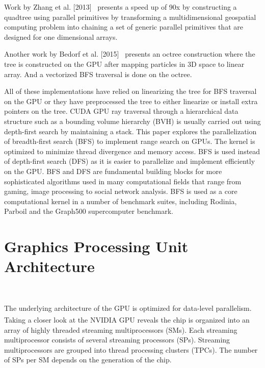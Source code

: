 Work by Zhang et al. [2013]~\cite{DBLP:journals/gis/ZhangY13} presents a speed up of 90x by constructing a quadtree using parallel primitives by transforming a multidimensional geospatial computing problem into chaining a set of generic parallel primitives that are designed for one dimensional arrays.

Another work by Bedorf et al. [2015]~\cite{Bedorf:2012:SOG:2133856.2134140} presents an octree construction where the tree is constructed on the GPU after mapping particles in 3D space to linear array. And a vectorized BFS traversal is done on the octree.

All of these implementations have relied on linearizing the tree for BFS traversal on the GPU or they have preprocessed the tree to either linearize or install extra pointers on the tree. 
CUDA GPU ray traversal through a hierarchical data structure such as a bounding volume hierarchy (BVH) is usually carried out using depth-first search by maintaining a stack.
This paper explores the parallelization of breadth-first search (BFS) to implement range search on GPUs. The kernel is optimized to minimize thread divergence and memory access. BFS is used instead of depth-first search (DFS) as it is easier to parallelize and implement efficiently on the GPU. BFS and DFS are fundamental building blocks for more sophisticated algorithms used in many computational fields that range from gaming, image processing to social network analysis. BFS is  used as a core computational kernel in a number of benchmark suites, including Rodinia, Parboil and the Graph500 supercomputer benchmark.

\section{Graphics Processing Unit Architecture}~\label{sec:gpu_overview}

The underlying architecture of the GPU is optimized for data-level
parallelism.  Taking a closer look at the
NVIDIA\textsuperscript{\textregistered} GPU reveals the chip is
organized into an array of highly threaded streaming multiprocessors 
(SMs). Each streaming multiprocessor consists of several streaming
processors (SPs). Streaming multiprocessors are grouped into thread
processing clusters (TPCs). The number of SPs per SM depends on the
generation of the chip.  

